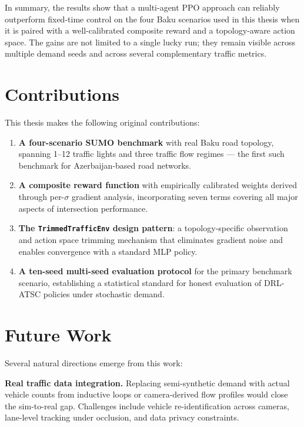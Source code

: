 \documentclass[12pt,oneside,a4paper]{report}
\newcommand{\ppo}{\textsc{PPO}}
\begin{document}
In summary, the results show that a multi-agent \ppo{} approach can
reliably outperform fixed-time control on the four Baku scenarios used
in this thesis when it is paired with a well-calibrated composite reward
and a topology-aware action space. The gains are not limited to a single
lucky run; they remain visible across multiple demand seeds and across
several complementary traffic metrics.

\section{Contributions}
\label{sec:contributions}

This thesis makes the following original contributions:

\begin{enumerate}[leftmargin=*]
  \item \textbf{A four-scenario SUMO benchmark} with real Baku
        road topology, spanning 1--12 traffic lights and three
        traffic flow regimes --- the first such benchmark for
        Azerbaijan-based road networks.

  \item \textbf{A composite reward function} with empirically
        calibrated weights derived through per-$\sigma$ gradient
        analysis, incorporating seven terms covering all major
        aspects of intersection performance.

  \item \textbf{The \texttt{TrimmedTrafficEnv} design pattern}:
        a topology-specific observation and action space trimming
        mechanism that eliminates gradient noise and enables
        convergence with a standard MLP policy.

  \item \textbf{A ten-seed multi-seed evaluation protocol}
        for the primary benchmark scenario, establishing a
        statistical standard for honest evaluation of DRL-ATSC
        policies under stochastic demand.
\end{enumerate}

\section{Future Work}
\label{sec:future}

Several natural directions emerge from this work:

\textbf{Real traffic data integration.}
Replacing semi-synthetic demand with actual vehicle counts from
inductive loops or camera-derived flow profiles would close the
sim-to-real gap.  Challenges include vehicle re-identification
across cameras, lane-level tracking under occlusion, and data
privacy constraints.
\end{document}

